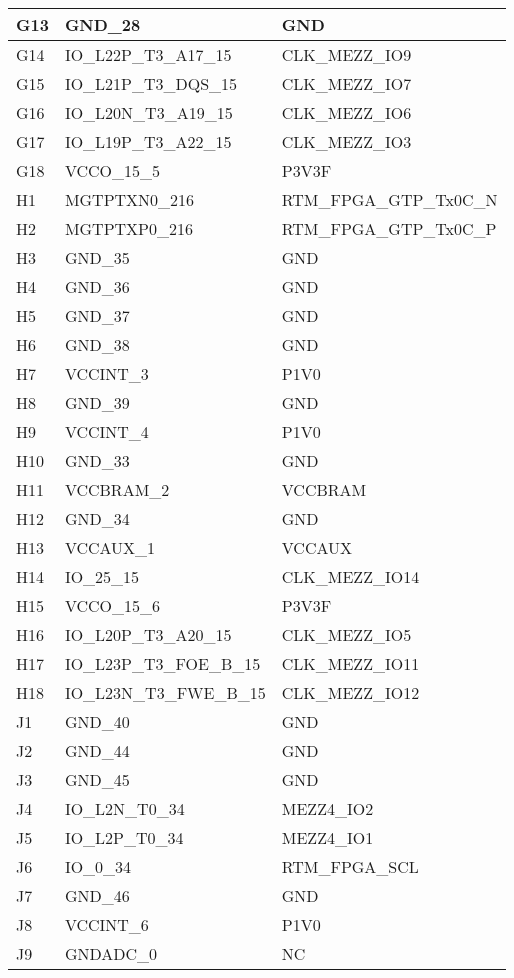 \begin{footnotesize}
\begin{longtable}{|l|p{6cm}|p{6cm}|}
G13	&	GND\_28	&	GND	\\ \hline
G14	&	IO\_L22P\_T3\_A17\_15	&	CLK\_MEZZ\_IO9	\\ \hline
G15	&	IO\_L21P\_T3\_DQS\_15	&	CLK\_MEZZ\_IO7	\\ \hline
G16	&	IO\_L20N\_T3\_A19\_15	&	CLK\_MEZZ\_IO6	\\ \hline
G17	&	IO\_L19P\_T3\_A22\_15	&	CLK\_MEZZ\_IO3	\\ \hline
G18	&	VCCO\_15\_5	&	P3V3F	\\ \hline
H1	&	MGTPTXN0\_216	&	RTM\_FPGA\_GTP\_Tx0C\_N	\\ \hline
H2	&	MGTPTXP0\_216	&	RTM\_FPGA\_GTP\_Tx0C\_P	\\ \hline
H3	&	GND\_35	&	GND	\\ \hline
H4	&	GND\_36	&	GND	\\ \hline
H5	&	GND\_37	&	GND	\\ \hline
H6	&	GND\_38	&	GND	\\ \hline
H7	&	VCCINT\_3	&	P1V0	\\ \hline
H8	&	GND\_39	&	GND	\\ \hline
H9	&	VCCINT\_4	&	P1V0	\\ \hline
H10	&	GND\_33	&	GND	\\ \hline
H11	&	VCCBRAM\_2	&	VCCBRAM	\\ \hline
H12	&	GND\_34	&	GND	\\ \hline
H13	&	VCCAUX\_1	&	VCCAUX	\\ \hline
H14	&	IO\_25\_15	&	CLK\_MEZZ\_IO14	\\ \hline
H15	&	VCCO\_15\_6	&	P3V3F	\\ \hline
H16	&	IO\_L20P\_T3\_A20\_15	&	CLK\_MEZZ\_IO5	\\ \hline
H17	&	IO\_L23P\_T3\_FOE\_B\_15	&	CLK\_MEZZ\_IO11	\\ \hline
H18	&	IO\_L23N\_T3\_FWE\_B\_15	&	CLK\_MEZZ\_IO12	\\ \hline
J1	&	GND\_40	&	GND	\\ \hline
J2	&	GND\_44	&	GND	\\ \hline
J3	&	GND\_45	&	GND	\\ \hline
J4	&	IO\_L2N\_T0\_34	&	MEZZ4\_IO2	\\ \hline
J5	&	IO\_L2P\_T0\_34	&	MEZZ4\_IO1	\\ \hline
J6	&	IO\_0\_34	&	RTM\_FPGA\_SCL	\\ \hline
J7	&	GND\_46	&	GND	\\ \hline
J8	&	VCCINT\_6	&	P1V0	\\ \hline
J9	&	GNDADC\_0	&	NC	\\ \hline

\end{longtable}
\end{footnotesize}

